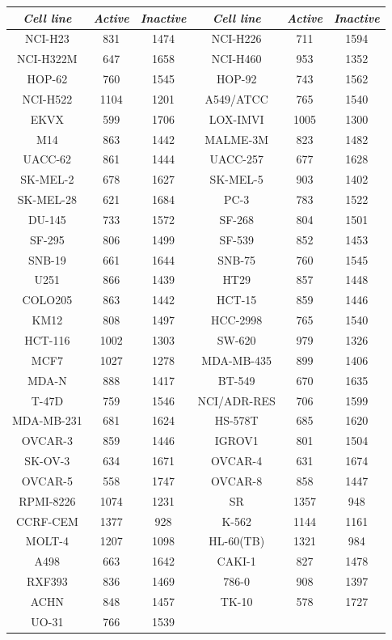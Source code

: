 \documentclass[english]{tktltiki}
\begin{document}
\begin{center}
\begin{table}
\centering
\begin{tabular}{|c|c|c||c|c|c|}\hline
\textbf{\em Cell line}	&\textbf{\em Active}	&\textbf{\em Inactive}	&\textbf{\em Cell line}	&\textbf{\em Active}	&\textbf{\em Inactive}	\\ \hline \hline

NCI-H23& 831& 1474 &NCI-H226& 711& 1594 \\ \hline
NCI-H322M& 647& 1658 &NCI-H460& 953& 1352 \\ \hline
HOP-62& 760& 1545 &HOP-92& 743& 1562 \\ \hline
NCI-H522& 1104& 1201 &A549/ATCC& 765& 1540 \\ \hline
EKVX& 599& 1706 &LOX-IMVI& 1005& 1300 \\ \hline
M14& 863& 1442 &MALME-3M& 823& 1482 \\ \hline
UACC-62& 861& 1444 &UACC-257& 677& 1628 \\ \hline
SK-MEL-2& 678& 1627 &SK-MEL-5& 903& 1402 \\ \hline
SK-MEL-28& 621& 1684 &PC-3& 783& 1522 \\ \hline
DU-145& 733& 1572 &SF-268& 804& 1501 \\ \hline
SF-295& 806& 1499 &SF-539& 852& 1453 \\ \hline
SNB-19& 661& 1644 &SNB-75& 760& 1545 \\ \hline
U251& 866& 1439 &HT29& 857& 1448 \\ \hline
COLO205& 863& 1442 &HCT-15& 859& 1446 \\ \hline
KM12& 808& 1497 &HCC-2998& 765& 1540 \\ \hline
HCT-116& 1002& 1303 &SW-620& 979& 1326 \\ \hline
MCF7& 1027& 1278 &MDA-MB-435& 899& 1406 \\ \hline
MDA-N& 888& 1417 &BT-549& 670& 1635 \\ \hline
T-47D& 759& 1546 &NCI/ADR-RES& 706& 1599 \\ \hline
MDA-MB-231& 681& 1624 &HS-578T& 685& 1620 \\ \hline
OVCAR-3& 859& 1446 &IGROV1& 801& 1504 \\ \hline
SK-OV-3& 634& 1671 &OVCAR-4& 631& 1674 \\ \hline
OVCAR-5& 558& 1747 &OVCAR-8& 858& 1447 \\ \hline
RPMI-8226& 1074& 1231 &SR& 1357& 948 \\ \hline
CCRF-CEM& 1377& 928 &K-562& 1144& 1161 \\ \hline
MOLT-4& 1207& 1098 &HL-60(TB)& 1321& 984 \\ \hline
A498& 663& 1642 &CAKI-1& 827& 1478 \\ \hline
RXF393& 836& 1469 &786-0& 908& 1397 \\ \hline
ACHN& 848& 1457 &TK-10& 578& 1727 \\ \hline
UO-31& 766& 1539 && & \\ \hline


\end{tabular}
\end{table}
\end{center}
\end{document}

